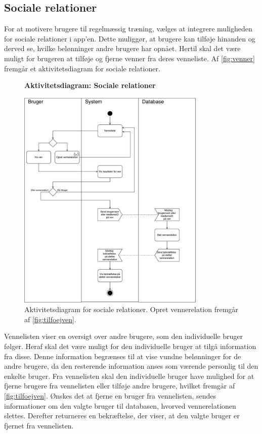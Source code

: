 \subsection*{Sociale relationer} 
For at motivere brugere til regelmæssig træning, vælges at integrere muligheden for sociale relationer i app'en. Dette muliggør, at brugere kan tilføje hinanden og derved se, hvilke belønninger andre brugere har opnået. Hertil skal det være muligt for brugeren at tilføje og fjerne venner fra deres venneliste. 
Af \autoref{fig:venner} fremgår et aktivitetsdiagram for sociale relationer. 

\begin{figure} [H]
\centering
\textbf{Aktivitetsdiagram: Sociale relationer}\par\medskip
\includegraphics[width=0.8\textwidth]{figures/aktivitetsdiagram/venner}
\caption{Aktivitetsdiagram for sociale relationer. Opret vennerelation fremgår af \autoref{fig:tilfoejven}.}
\label{fig:venner}
\end{figure}

\noindent
Vennelisten viser en oversigt over andre brugere, som den individuelle bruger følger. Heraf skal det være muligt for den individuelle bruger at tilgå information fra disse. Denne information begrænses til at vise vundne belønninger for de andre brugere, da den resterende information anses som værende personlig til den enkelte bruger. 
Fra vennelisten skal den individuelle bruger have mulighed for at fjerne brugere fra vennelisten eller tilføje andre brugere, hvilket fremgår af \autoref{fig:tilfoejven}.  
Ønskes det at fjerne en bruger fra vennelisten, sendes informationer om den valgte bruger til databasen, hvorved vennerelationen slettes. Derefter returneres en bekræftelse, der viser, at den valgte bruger er fjernet fra vennelisten. 

